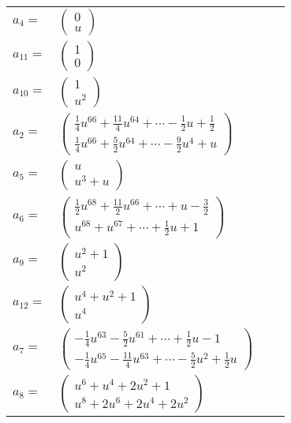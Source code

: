 \documentclass[1p]{elsarticle_modified}
\theoremstyle{definition}
\begin{document}
\begin{tabular}{m{7pt} m{180pt} m{7pt} m{180pt} }
\flushright $a_{4}=$&$\begin{pmatrix}0\\u\end{pmatrix}$ \\
\flushright $a_{11}=$&$\begin{pmatrix}1\\0\end{pmatrix}$ \\
\flushright $a_{10}=$&$\begin{pmatrix}1\\u^2\end{pmatrix}$ \\
\flushright $a_{2}=$&$\begin{pmatrix}\frac{1}{4} u^{66}+\frac{11}{4} u^{64}+\cdots-\frac{1}{2} u+\frac{1}{2}\\\frac{1}{4} u^{66}+\frac{5}{2} u^{64}+\cdots-\frac{9}{2} u^4+u\end{pmatrix}$ \\
\flushright $a_{5}=$&$\begin{pmatrix}u\\u^3+u\end{pmatrix}$ \\
\flushright $a_{6}=$&$\begin{pmatrix}\frac{1}{2} u^{68}+\frac{11}{2} u^{66}+\cdots+u-\frac{3}{2}\\u^{68}+u^{67}+\cdots+\frac{1}{2} u+1\end{pmatrix}$ \\
\flushright $a_{9}=$&$\begin{pmatrix}u^2+1\\u^2\end{pmatrix}$ \\
\flushright $a_{12}=$&$\begin{pmatrix}u^4+u^2+1\\u^4\end{pmatrix}$ \\
\flushright $a_{7}=$&$\begin{pmatrix}-\frac{1}{4} u^{63}-\frac{5}{2} u^{61}+\cdots+\frac{1}{2} u-1\\-\frac{1}{4} u^{65}-\frac{11}{4} u^{63}+\cdots-\frac{5}{2} u^2+\frac{1}{2} u\end{pmatrix}$ \\
\flushright $a_{8}=$&$\begin{pmatrix}u^6+u^4+2 u^2+1\\u^8+2 u^6+2 u^4+2 u^2\end{pmatrix}$ \\

\end{tabular}
\end{document}
